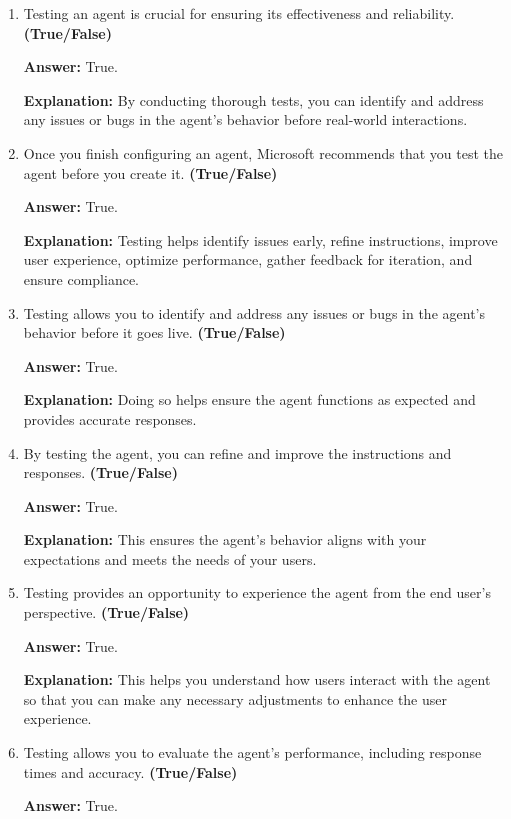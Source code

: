\documentclass[10pt]{article}
\begin{document}
\begin{enumerate}[leftmargin=*]

\item Testing an agent is crucial for ensuring its effectiveness and reliability. \textbf{(True/False)}

\textbf{Answer:} True.

\textbf{Explanation:} By conducting thorough tests, you can identify and address any issues or bugs in the agent's behavior before real-world interactions.

\item Once you finish configuring an agent, Microsoft recommends that you test the agent before you create it. \textbf{(True/False)}

\textbf{Answer:} True.

\textbf{Explanation:} Testing helps identify issues early, refine instructions, improve user experience, optimize performance, gather feedback for iteration, and ensure compliance.

\item Testing allows you to identify and address any issues or bugs in the agent's behavior before it goes live. \textbf{(True/False)}

\textbf{Answer:} True.

\textbf{Explanation:} Doing so helps ensure the agent functions as expected and provides accurate responses.

\item By testing the agent, you can refine and improve the instructions and responses. \textbf{(True/False)}

\textbf{Answer:} True.

\textbf{Explanation:} This ensures the agent's behavior aligns with your expectations and meets the needs of your users.

\item Testing provides an opportunity to experience the agent from the end user's perspective. \textbf{(True/False)}

\textbf{Answer:} True.

\textbf{Explanation:} This helps you understand how users interact with the agent so that you can make any necessary adjustments to enhance the user experience.

\item Testing allows you to evaluate the agent's performance, including response times and accuracy. \textbf{(True/False)}

\textbf{Answer:} True.


\end{enumerate}
\end{document}
